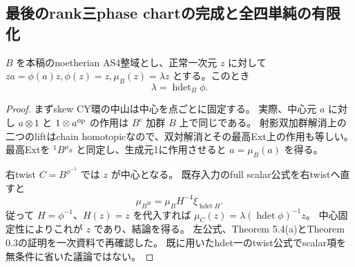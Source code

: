 \subsection{最後のrank三phase chartの完成と全四単純の有限化}
\label{subsec:cubic-four-simple-zero-pair-rank3}
\begin{lemma}[正常一次元の中山固有値と正常化のhdet]
\label{lem:cubic-normal-linear-hdet}
$B$ を本稿のnoetherian AS4整域とし、正常一次元 $z$ に対して
$za=\phi(a)z,\phi(z)=z,\mu_B(z)=\lambda z$ とする。このとき
\[
 \lambda=\operatorname{hdet}_B\phi.
\]
\end{lemma}
\begin{proof}
まずskew CY環の中山は中心を点ごとに固定する。
実際、中心元 $a$ に対し $a\otimes1$ と $1\otimes a^{\rm op}$ の作用は
$B^e$ 加群 $B$ 上で同じである。
射影双加群解消上の二つのliftはchain homotopicなので、双対解消とその最高Ext上の作用も等しい。
最高Extを ${}^1B^{\mu_B}$ と同定し、生成元1に作用させると $a=\mu_B(a)$ を得る。

右twist $C=B^{\phi^{-1}}$ では $z$ が中心となる。
既存入力\cite[Theorem 0.3]{RRZ}のfull scalar公式を右twistへ直すと
\[
 \mu_{B^H}=\mu_B H^{-4}\xi_{\operatorname{hdet}H}.
\]
従って $H=\phi^{-1}$、$H(z)=z$ を代入すれば
$\mu_C(z)=\lambda(\operatorname{hdet}\phi)^{-1}z$。
中心固定性によりこれが $z$ であり、結論を得る。
左公式、Theorem 5.4(a)とTheorem 0.3の証明を一次資料で再確認した。
既に用いたhdet一のtwist公式でscalar項を無条件に省いた議論ではない。
\end{proof}

